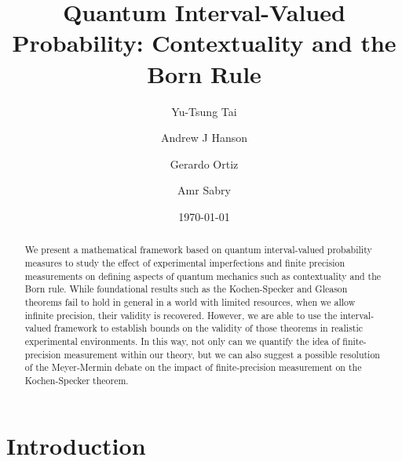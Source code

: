 \documentclass[english,reprint, aps, prl,superscriptaddress, showpacs,
showkeys, longbibliography, amsmath, amssymb]{revtex4-1}
\theoremstyle{plain}
\theoremstyle{definition}
\begin{document}
\title{Quantum Interval-Valued Probability: Contextuality and the Born Rule}

\author{Yu-Tsung Tai}

\author{Andrew J Hanson}

\author{Gerardo Ortiz}

\author{Amr Sabry}

\date{\today}

\begin{abstract}
We present a mathematical framework based on quantum interval-valued
probability measures to study the effect of experimental imperfections
and finite precision measurements on defining aspects of quantum
mechanics such as contextuality and the Born rule. While foundational
results such as the Kochen-Specker and Gleason theorems fail to hold
in general in a world with limited resources, when we allow infinite
precision, their validity is recovered.  However, we are able to use
the interval-valued framework to establish bounds on the validity of
those theorems in realistic experimental environments. In this way,
not only can we quantify the idea of finite-precision measurement
within our theory, but we can also suggest a possible resolution of
the Meyer-Mermin debate on the impact of finite-precision measurement
on the Kochen-Specker theorem.
\end{abstract}



\maketitle

\section{Introduction}
\end{document}
